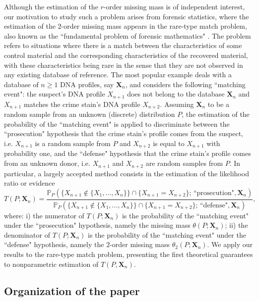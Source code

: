 \documentclass{article}
\newcommand{\1}{\boldsymbol{1}}
\theoremstyle{plain}
\begin{document}
Although the estimation of the $r$-order missing mass is of independent interest, our motivation to study such a problem arises from forensic statistics, where the estimation of the $2$-order missing mass appears in  the rare-type match problem, also known as the ``fundamental problem of forensic mathematics" \cite{Bre(10),Cer(17),Cer(20)}. The problem refers to situations where there is a match between the characteristics of some control material and the corresponding characteristics of the recovered material, with these characteristics being rare in the sense that they are not observed in any existing database of reference. The most popular example deals with a database of $n\geq1$ DNA profiles, say $\mathbf{X}_{n}$, and considers the following ``matching event": the suspect's DNA profile $X_{n+1}$ does not belong to the database $\mathbf{X}_{n}$ and $X_{n+1}$ matches the crime stain's DNA profile $X_{n+2}$. Assuming $\mathbf{X}_{n}$ to be a random sample from an unknown (discrete) distribution $P$, the estimation of the probability of the ``matching event" is applied to discriminate between the ``prosecution" hypothesis that the crime stain's profile comes from the suspect, i.e. $X_{n+1}$ is a random sample from $P$ and $X_{n+2}$ is equal to $X_{n+1}$ with probability one, and the ``defense" hypothesis that the crime stain's profile comes from an unknown donor, i.e. $X_{n+1}$ and $X_{n+2}$ are random samples from $P$. In particular, a largely accepted method consists in the estimation of the likelihood ratio or  evidence
\begin{displaymath}
T(P;\mathbf{X}_{n})=\frac{\mathbb{P}_{P}(\{X_{n+1}\notin\{X_{1},\ldots,X_{n}\}\}\cap\{X_{n+1}=X_{n+2}\};\,\text{``prosecution"}, \mathbf{X}_n)}{\mathbb{P}_{P}(\{X_{n+1}\notin\{X_{1},\ldots,X_{n}\}\}\cap\{X_{n+1}=X_{n+2}\};\,\text{``defense"},\mathbf{X}_n)},
\end{displaymath}
where: i) the numerator of $T(P;\mathbf{X}_{n})$ is the probability of the ``matching event" under the ``prosecution" hypothesis, namely the missing mass $\theta(P;\mathbf{X}_{n})$; ii) the denominator of $T(P;\mathbf{X}_{n})$ is the probability of the ``matching event" under the ``defense" hypothesis, namely the $2$-order missing mass $\theta_{2}(P;\mathbf{X}_{n})$. We apply our results to the rare-type match problem, presenting the first theoretical guarantees to nonparametric estimation of $T(P,\mathbf{X}_{n})$.

\subsection{Organization of the paper}
\end{document}

